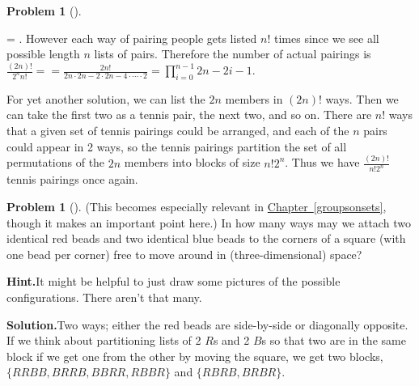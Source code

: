 \documentclass[10pt,]{book}
\theoremstyle{plain}
\theoremstyle{definition}
\newtheorem{activity}[project]{Problem}
\theoremstyle{definition}
\numberwithin{equation}{chapter}
\begin{document}
\begin{activity}[]
\begin{enumerate}[font=\bfseries,label=(\alph*),ref=\alph*]
= \). However each way of pairing people gets listed \(n!\) times since we see all possible length \(n\) lists of pairs. Therefore the number of actual pairings is \(\frac{(2n)!}{2^n n!}= = \frac{2n!}{2n\cdot2n-2\cdot2n-4\cdot \cdots\cdot 2} =  \prod_{i=0}^{n-1} 2n-2i-1\).%
\par
For yet another solution, we can list the \(2n\) members in \((2n)!\) ways. Then we can take the first two as a tennis pair, the next two, and so on. There are \(n!\) ways that a given set of tennis pairings could be arranged, and each of the \(n\) pairs could appear in 2 ways, so the tennis pairings partition the set of all permutations of the \(2n\) members into blocks of size \(n!2^n\). Thus we have \(\frac{(2n)!}{n!2^n}\) tennis pairings once again.%
\end{enumerate}
\end{activity}
\begin{activity}[]\label{twocolorsofbeads}
(This becomes especially relevant in \hyperref[groupsonsets]{Chapter~\ref{groupsonsets}}, though it makes an important point here.) In how many ways may we attach two identical red beads and two identical blue beads to the corners of a square (with one bead per corner) free to move around in (three-dimensional) space?%
\par\medskip\noindent%
\textbf{Hint.}\quad It might be helpful to just draw some pictures of the possible configurations. There aren't that many.%
\par\medskip\noindent%
\textbf{Solution.}\quad Two ways; either the red beads are side-by-side or diagonally opposite. If we think about partitioning lists of 2 \(R\)s and 2 \(B\)s so that two are in the same block if we get one from the other by moving the square, we get two blocks, \(\{RRBB, BRRB, BBRR, RBBR\}\) and \(\{RBRB, BRBR\}\).%
\end{activity}
\end{document}
